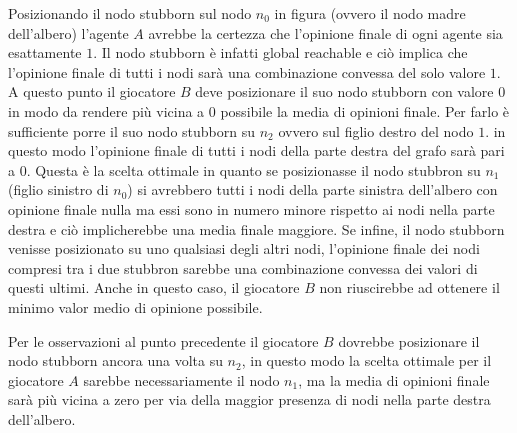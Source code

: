 
\begin{alphaparts}
    \questionpart %
Posizionando il nodo stubborn sul nodo $n_0$ in figura (ovvero il nodo madre dell’albero) l’agente $A$ avrebbe la certezza che l’opinione finale di ogni agente sia esattamente $1$. Il nodo stubborn è infatti global reachable e ciò implica che l’opinione finale di tutti i nodi sarà una combinazione convessa del solo valore $1$. 
A questo punto il giocatore $B$ deve posizionare il suo nodo stubborn con valore $0$ in modo da rendere più vicina a $0$ possibile la media di opinioni finale.
Per farlo è sufficiente porre il suo nodo stubborn su $n_2$ ovvero sul figlio destro del nodo $1$. in questo modo l’opinione finale di tutti i nodi della parte destra del grafo sarà pari a $0$.
Questa è la scelta ottimale in quanto se posizionasse il nodo stubbron su $n_1$ (figlio sinistro di $n_0$) si avrebbero tutti i nodi della parte sinistra dell’albero con opinione finale nulla ma essi sono in numero minore rispetto ai nodi nella parte destra e ciò implicherebbe una media finale maggiore.
Se infine, il nodo stubborn venisse posizionato su uno qualsiasi degli altri nodi, l’opinione finale dei nodi compresi tra i due stubbron sarebbe una combinazione convessa dei valori di questi ultimi. Anche in questo caso, il giocatore $B$ non riuscirebbe ad ottenere il minimo valor medio di opinione possibile. 
   

    

    \questionpart %

Per le osservazioni al punto precedente il giocatore $B$ dovrebbe posizionare il nodo stubborn ancora una volta su $n_2$, in questo modo la scelta ottimale per il giocatore $A$ sarebbe necessariamente il nodo $n_1$, ma la media di opinioni finale sarà più vicina a zero per via della maggior presenza di nodi nella parte destra dell’albero.

    
\end{alphaparts}
